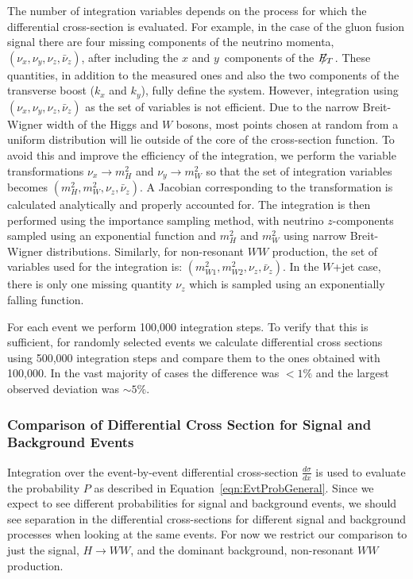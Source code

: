 \documentclass{cmspaper}
\newcommand{\met}{\mbox{$E_T\hspace{-1.1em}/$\hspace{0.7em}}}
\begin{document}
The number of integration variables depends on the process for which the differential cross-section is evaluated. For example,
in the case of the gluon fusion signal there are four missing components of the neutrino momenta,
$(\nu_{x}, \nu_{y}, \nu_{z}, \bar{\nu}_{z})$, after including the $x$ and $y$~components of the $\met$.  
These quantities, in addition to the measured ones and also the two components of the transverse boost 
($k_{x}$ and $k_{y}$), fully define the system.
However, integration using  $(\nu_{x}, \nu_{y}, \nu_{z}, \bar{\nu}_{z})$ as the set of variables is not efficient.  Due to the narrow 
Breit-Wigner width of the Higgs and $W$ bosons, most points chosen at random from a uniform distribution will lie outside of 
the core of the cross-section function. To avoid this and improve the
efficiency of the integration, we perform the variable transformations 
$\nu_{x} \rightarrow m_{H}^{2}$ and $\nu_{y} \rightarrow m_{W}^{2}$ 
so that the set of integration variables becomes $(m_{H}^{2}, m_{W}^{2}, \nu_{z}, \bar{\nu}_{z})$.
A Jacobian corresponding to the transformation is calculated analytically and properly 
accounted for. The integration is then performed using the importance sampling method, with neutrino $z$-components sampled
using an exponential function and $m_{H}^{2}$ and $m_{W}^{2}$ using narrow Breit-Wigner distributions.
Similarly, for non-resonant $WW$ production, the set of variables used for the integration is:
$(m_{W1}^{2}, m_{W2}^{2}, \nu_{z}, \bar{\nu}_{z})$. In the $W$+jet case, there is only one missing quantity $\nu_{z}$ which is sampled using 
an exponentially falling function.

For each event we perform 100,000 integration steps. To verify that this is sufficient, for randomly selected events we calculate differential cross
sections using 500,000 integration steps and compare them to the ones obtained with 100,000. In the vast majority of cases the difference
was $< 1\%$ and the largest observed deviation was $\sim 5\%$. 

\subsubsection{Comparison of Differential Cross Section for Signal and Background Events}

Integration over the event-by-event differential cross-section $\frac{d\sigma}{dx}$ is used to evaluate the probability $P$ as described
in Equation~\ref{eqn:EvtProbGeneral}.  Since we expect to see different probabilities for signal and background events,
we should see separation in the differential cross-sections for different signal and
background processes when looking at the same events.  For now we restrict our comparison to just the signal,
$H\rightarrow WW$, and the dominant background, non-resonant $WW$ production.
\end{document}
